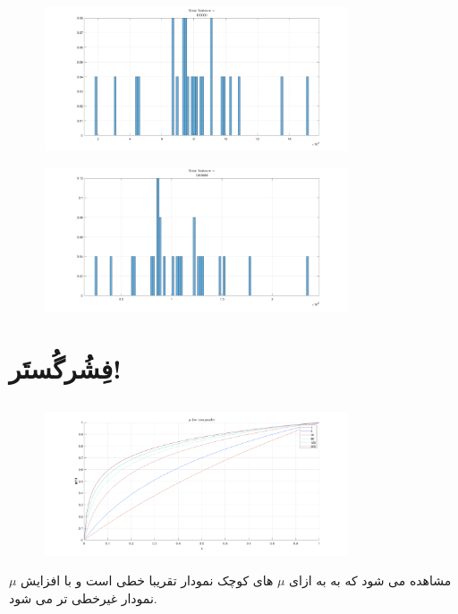 \documentclass[a4paper]{article}
\begin{document}
		\begin{figure}[H]
		\includegraphics[width=0.8\textwidth]{comsys_fig56.png}\\ 
		\centering
	\end{figure}
		\begin{figure}[H]
		\includegraphics[width=0.8\textwidth]{comsys_fig57.png}\\ 
		\centering
	\end{figure}
	\section{فِشُرگُستَر!}
	\subsection{}
	\begin{figure}[H]
		\includegraphics[width=0.8\textwidth]{comsys_fig58.png}\\ 
		\centering
	\end{figure}
	مشاهده می شود که به به ازای 
	$\mu$
	های کوچک نمودار تقریبا خطی است و با افزایش 
	$\mu$
	نمودار غیرخطی تر می شود.
\end{document}
